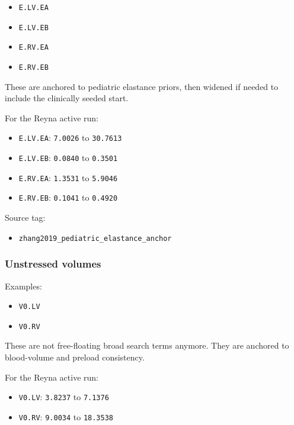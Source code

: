 \documentclass[11pt,a4paper]{article}
\begin{document}
\begin{itemize}[leftmargin=1.5em]
    \item \texttt{E.LV.EA}
    \item \texttt{E.LV.EB}
    \item \texttt{E.RV.EA}
    \item \texttt{E.RV.EB}
\end{itemize}

These are anchored to pediatric elastance priors, then widened if needed to
include the clinically seeded start.

For the Reyna active run:

\begin{itemize}[leftmargin=1.5em]
    \item \texttt{E.LV.EA}: \texttt{7.0026} to \texttt{30.7613}
    \item \texttt{E.LV.EB}: \texttt{0.0840} to \texttt{0.3501}
    \item \texttt{E.RV.EA}: \texttt{1.3531} to \texttt{5.9046}
    \item \texttt{E.RV.EB}: \texttt{0.1041} to \texttt{0.4920}
\end{itemize}

Source tag:

\begin{itemize}[leftmargin=1.5em]
    \item \texttt{zhang2019\_pediatric\_elastance\_anchor}
\end{itemize}

\subsubsection{Unstressed volumes}

Examples:

\begin{itemize}[leftmargin=1.5em]
    \item \texttt{V0.LV}
    \item \texttt{V0.RV}
\end{itemize}

These are not free-floating broad search terms anymore. They are anchored to
blood-volume and preload consistency.

For the Reyna active run:

\begin{itemize}[leftmargin=1.5em]
    \item \texttt{V0.LV}: \texttt{3.8237} to \texttt{7.1376}
    \item \texttt{V0.RV}: \texttt{9.0034} to \texttt{18.3538}
\end{itemize}
\end{document}
